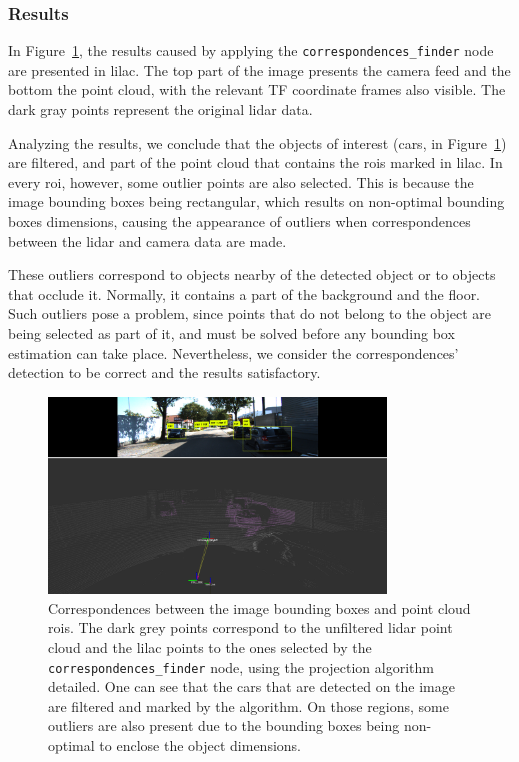 \subsubsection{Results}
In Figure~\ref{fig:projected-correspondences}, the results caused by applying the \texttt{correspondences\_finder} node are presented in lilac. The top part of the image presents the camera feed and the bottom the point cloud, with the relevant TF coordinate frames also visible. The  dark gray points represent the original \ac{lidar} data. 

Analyzing the results, we conclude that the objects of interest (cars, in Figure~\ref{fig:projected-correspondences}) are filtered, and part of the point cloud that contains the \acp{roi} marked in lilac. In every \ac{roi}, however, some outlier points are also selected. This is because the image bounding boxes being rectangular, which results on non-optimal bounding boxes dimensions, causing the appearance of outliers when correspondences between the \ac{lidar} and camera data are made.

These outliers correspond to objects nearby of the detected object or to objects that occlude it. Normally, it contains a part of the background and the floor. Such outliers pose a problem, since points that do not belong to the object are being selected as part of it, and must be solved before any bounding box estimation can take place. Nevertheless, we consider the correspondences' detection to be correct and the results satisfactory.


\begin{figure}[!ht]
	\centering
	\includegraphics[width=0.8\textwidth]{img/image-object-to-point-cloud/projected_correspondences.png}
	\caption[Points corresponding to the image objects' bounding boxes, using the $3D \rightarrow 2D$ correspondences algorithm.]{Correspondences between the image bounding boxes and point cloud \acp{roi}. The dark grey points correspond to the unfiltered \ac{lidar} point cloud and the lilac points to the ones selected by the \texttt{correspondences\_finder} node, using the projection algorithm detailed. One can see that the cars that are detected on the image are filtered and marked by the algorithm. On those regions, some outliers are also present due to the bounding boxes being non-optimal to enclose the object dimensions.}
	\label{fig:projected-correspondences}
\end{figure}

